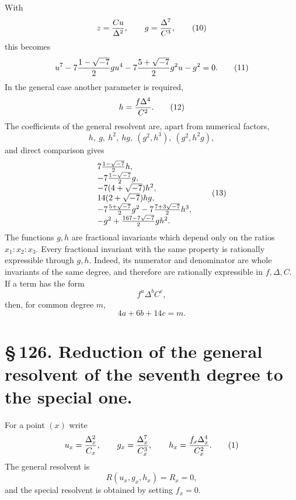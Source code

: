 \documentclass[11pt]{article}
\begin{document}
With
\begin{equation}
z={Cu\over\Delta^2},\qquad g={\Delta^7\over C^3},
\tag{10}
\end{equation}
this becomes
\begin{equation}
u^7-7{1-\sqrt{-7}\over2}g u^4-7{5+\sqrt{-7}\over2}g^2u-g^2=0.
\tag{11}
\end{equation}
In the general case another parameter is required,
\begin{equation}
h={f\Delta^4\over C^2}.
\tag{12}
\end{equation}
The coefficients of the general resolvent are, apart from numerical factors,
\begin{equation}
h,\ g,\ h^2,\ hg,\ (g^2,h^3),\ (g^2,h^2g),
\end{equation}
and direct comparison gives
\begin{equation}
\begin{array}{rcl}
&& 7{1-\sqrt{-7}\over2}h,\\
&&-7{1-\sqrt{-7}\over2}g,\\
&&-7(4+\sqrt{-7})h^2,\\
&&14(2+\sqrt{-7})hg,\\
&&-7{5+\sqrt{-7}\over2}g^2-7{7+3\sqrt{-7}\over2}h^3,\\
&&-g^2+{167-7\sqrt{-7}\over2}gh^2.
\end{array}
\tag{13}
\end{equation}
The functions \(g,h\) are fractional invariants which depend only on the ratios \(x_1:x_2:x_3\). Every fractional invariant with the same property is rationally expressible through \(g,h\). Indeed, its numerator and denominator are whole invariants of the same degree, and therefore are rationally expressible in \(f,\Delta,C\). If a term has the form
\begin{equation}
f^a\Delta^b C^c,
\end{equation}
then, for common degree \(m\),
\begin{equation}
4a+6b+14c=m.
\tag{14}
\end{equation}

\section*{\S\,126. Reduction of the general resolvent of the seventh degree to the special one.}

For a point \((x)\) write
\begin{equation}
u_x={\Delta_x^2\over C_x},\qquad g_x={\Delta_x^7\over C_x^3},\qquad h_x={f_x\Delta_x^4\over C_x^2}.
\tag{1}
\end{equation}
The general resolvent is
\begin{equation}
R(u_x,g_x,h_x)=R_x=0,
\tag{2}
\end{equation}
and the special resolvent is obtained by setting \(f_x=0\).
\end{document}
